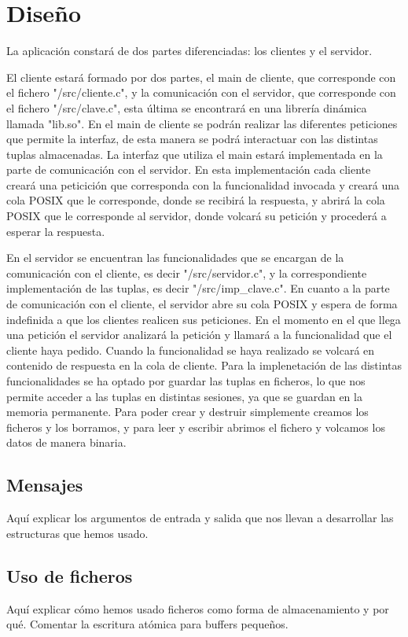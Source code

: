 \documentclass[]{article}
\begin{document}
\section{Diseño}
\label{sec:disenno}
La aplicación constará de dos partes diferenciadas: los clientes y el servidor.

El cliente estará formado por dos partes, el main de cliente, que corresponde con el fichero "/src/cliente.c", y la comunicación con el servidor, que corresponde con el fichero "/src/clave.c", esta última se encontrará en una librería dinámica llamada "lib.so".
En el main de cliente se podrán realizar las diferentes peticiones que permite la interfaz, de esta manera se podrá interactuar con las distintas tuplas almacenadas. La interfaz que utiliza el main estará implementada en la parte de comunicación con el servidor. 
En esta implementación cada cliente creará una peticición que corresponda con la funcionalidad invocada y creará una cola POSIX que le corresponde, donde se recibirá la respuesta, y abrirá la cola POSIX que le corresponde al servidor, donde volcará su petición y procederá a esperar la respuesta.

En el servidor se encuentran las funcionalidades que se encargan de la comunicación con el cliente, es decir "/src/servidor.c", y la correspondiente implementación de las tuplas, es decir "/src/imp_clave.c".
En cuanto a la parte de comunicación con el cliente, el servidor abre su cola POSIX y espera de forma indefinida a que los clientes realicen sus peticiones. En el momento en el que llega una petición el servidor analizará la petición y llamará a la funcionalidad que el cliente haya pedido. Cuando la funcionalidad se haya realizado se volcará en contenido de respuesta en la cola de cliente.
Para la implenetación de las distintas funcionalidades se ha optado por guardar las tuplas en ficheros, lo que nos permite acceder a las tuplas en distintas sesiones, ya que se guardan en la memoria permanente.
Para poder crear y destruir simplemente creamos los ficheros y los borramos, y para leer y escribir abrimos el fichero y volcamos los datos de manera binaria.
\subsection{Mensajes}
\label{subsec:mensajes}
Aquí explicar los argumentos de entrada y salida que nos llevan a desarrollar las estructuras que hemos usado.


\subsection{Uso de ficheros}
\label{subsec:uso_de_ficheros}
Aquí explicar cómo hemos usado ficheros como forma de almacenamiento y por qué. Comentar la escritura atómica para buffers pequeños. 
\end{document}
